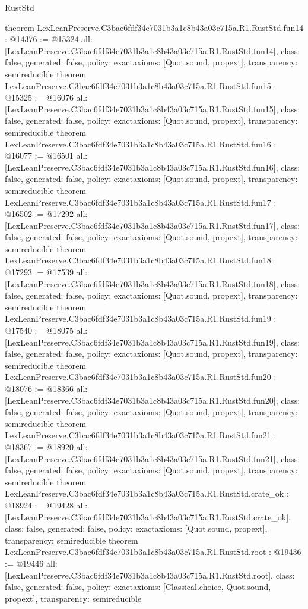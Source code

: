 \begin{lexlean}{RustStd}
\begin{coremodule}
{}
theorem LexLeanPreserve.C3bac6fdf34e7031b3a1c8b43a03c715a.R1.RustStd.fun14 : @14376 := @15324 {
  all: [LexLeanPreserve.C3bac6fdf34e7031b3a1c8b43a03c715a.R1.RustStd.fun14],
  class: false,
  generated: false,
  policy: exact{axioms: [Quot.sound, propext]},
  transparency: semireducible
}
theorem LexLeanPreserve.C3bac6fdf34e7031b3a1c8b43a03c715a.R1.RustStd.fun15 : @15325 := @16076 {
  all: [LexLeanPreserve.C3bac6fdf34e7031b3a1c8b43a03c715a.R1.RustStd.fun15],
  class: false,
  generated: false,
  policy: exact{axioms: [Quot.sound, propext]},
  transparency: semireducible
}
theorem LexLeanPreserve.C3bac6fdf34e7031b3a1c8b43a03c715a.R1.RustStd.fun16 : @16077 := @16501 {
  all: [LexLeanPreserve.C3bac6fdf34e7031b3a1c8b43a03c715a.R1.RustStd.fun16],
  class: false,
  generated: false,
  policy: exact{axioms: [Quot.sound, propext]},
  transparency: semireducible
}
theorem LexLeanPreserve.C3bac6fdf34e7031b3a1c8b43a03c715a.R1.RustStd.fun17 : @16502 := @17292 {
  all: [LexLeanPreserve.C3bac6fdf34e7031b3a1c8b43a03c715a.R1.RustStd.fun17],
  class: false,
  generated: false,
  policy: exact{axioms: [Quot.sound, propext]},
  transparency: semireducible
}
theorem LexLeanPreserve.C3bac6fdf34e7031b3a1c8b43a03c715a.R1.RustStd.fun18 : @17293 := @17539 {
  all: [LexLeanPreserve.C3bac6fdf34e7031b3a1c8b43a03c715a.R1.RustStd.fun18],
  class: false,
  generated: false,
  policy: exact{axioms: [Quot.sound, propext]},
  transparency: semireducible
}
theorem LexLeanPreserve.C3bac6fdf34e7031b3a1c8b43a03c715a.R1.RustStd.fun19 : @17540 := @18075 {
  all: [LexLeanPreserve.C3bac6fdf34e7031b3a1c8b43a03c715a.R1.RustStd.fun19],
  class: false,
  generated: false,
  policy: exact{axioms: [Quot.sound, propext]},
  transparency: semireducible
}
theorem LexLeanPreserve.C3bac6fdf34e7031b3a1c8b43a03c715a.R1.RustStd.fun20 : @18076 := @18366 {
  all: [LexLeanPreserve.C3bac6fdf34e7031b3a1c8b43a03c715a.R1.RustStd.fun20],
  class: false,
  generated: false,
  policy: exact{axioms: [Quot.sound, propext]},
  transparency: semireducible
}
theorem LexLeanPreserve.C3bac6fdf34e7031b3a1c8b43a03c715a.R1.RustStd.fun21 : @18367 := @18920 {
  all: [LexLeanPreserve.C3bac6fdf34e7031b3a1c8b43a03c715a.R1.RustStd.fun21],
  class: false,
  generated: false,
  policy: exact{axioms: [Quot.sound, propext]},
  transparency: semireducible
}
theorem LexLeanPreserve.C3bac6fdf34e7031b3a1c8b43a03c715a.R1.RustStd.crate_ok : @18924 := @19428 {
  all: [LexLeanPreserve.C3bac6fdf34e7031b3a1c8b43a03c715a.R1.RustStd.crate_ok],
  class: false,
  generated: false,
  policy: exact{axioms: [Quot.sound, propext]},
  transparency: semireducible
}
theorem LexLeanPreserve.C3bac6fdf34e7031b3a1c8b43a03c715a.R1.RustStd.root : @19436 := @19446 {
  all: [LexLeanPreserve.C3bac6fdf34e7031b3a1c8b43a03c715a.R1.RustStd.root],
  class: false,
  generated: false,
  policy: exact{axioms: [Classical.choice, Quot.sound, propext]},
  transparency: semireducible
}


\end{coremodule}
\end{lexlean}
